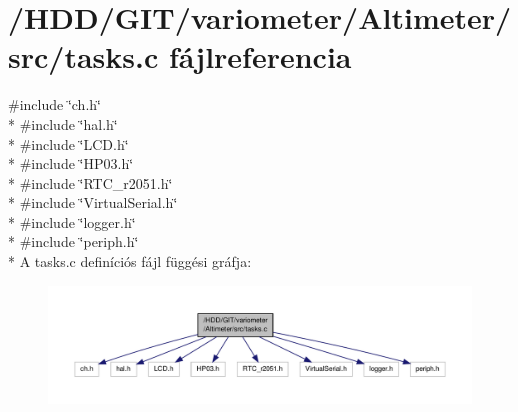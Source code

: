 \section{/\-H\-D\-D/\-G\-I\-T/variometer/\-Altimeter/src/tasks.c fájlreferencia}
\label{tasks_8c}
{\ttfamily \#include \char`\"{}ch.\-h\char`\"{}}\\*
{\ttfamily \#include \char`\"{}hal.\-h\char`\"{}}\\*
{\ttfamily \#include \char`\"{}L\-C\-D.\-h\char`\"{}}\\*
{\ttfamily \#include \char`\"{}H\-P03.\-h\char`\"{}}\\*
{\ttfamily \#include \char`\"{}R\-T\-C\-\_\-r2051.\-h\char`\"{}}\\*
{\ttfamily \#include \char`\"{}Virtual\-Serial.\-h\char`\"{}}\\*
{\ttfamily \#include \char`\"{}logger.\-h\char`\"{}}\\*
{\ttfamily \#include \char`\"{}periph.\-h\char`\"{}}\\*
A tasks.\-c definíciós fájl függési gráfja\-:
\nopagebreak
\begin{figure}[H]
\begin{center}
\leavevmode
\includegraphics[width=350pt]{tasks_8c__incl}
\end{center}
\end{figure}
